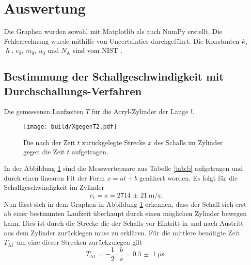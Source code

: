 \section{Auswertung}
\label{sec:Auswertung}


Die Graphen wurden sowohl mit Matplotlib \cite{matplotlib} als auch NumPy \cite{numpy} erstellt. Die
Fehlerrechnung wurde mithilfe von Uncertainties \cite{uncertainties} durchgeführt.
Die Konstanten $k$, $\hslash$, $e_0$, $m_0$, $u_0$ und $N_\text{A}$ sind vom NIST \cite{nistgov}.

\subsection{Bestimmung der Schallgeschwindigkeit mit Durchschallungs-Verfahren}
\begin{table}
	\centering
	\caption{Die gemessenen Laufzeiten $T$ für die Acryl-Zylinder der Länge $l$.}
	
\end{table}
\begin{figure}
	\centering
	\caption{Die nach der Zeit $t$ zurückgelegte Strecke $x$ des Schalls im Zylinder gegen die Zeit $t$ aufgetragen.}
	\texttt{[image: build/XgegenT2.pdf]}
	\label{fig:XgegenT2}
\end{figure}
In der Abbildung \ref{fig:XgegenT2} sind die Messwertepaare aus Tabelle \ref{tab:b} aufgetragen und durch einen linearen Fit der Form $x=a t + b$ genähert worden.
Es folgt für die Schallgeschwindigkeit im Zylinder
\begin{equation}
	c_1=a=\SI{2714(21)}{\meter\per\second}\text{.}
\end{equation}
Nun lässt sich in dem Graphen in Abbildung \ref{fig:XgegenT2} erkennen, dass der Schall sich erst ab einer bestimmten Laufzeit überhaupt durch einen möglichen Zylinder bewegen kann. Dies ist durch die Strecke die der Schalls vor Eintritt in und nach Austritt aus dem Zylinder zurücklegen muss zu erklären. Für die mittlere benötigte Zeit $T_{\text{A}1}$ um eine dieser Strecken zurückzulegen gilt 
\begin{equation}
	T_{\text{A}1}=-\frac{1}{2} \cdot \frac{b}{a}=\SI{0.5(1)}{\micro\second}\text{.}
\end{equation}



